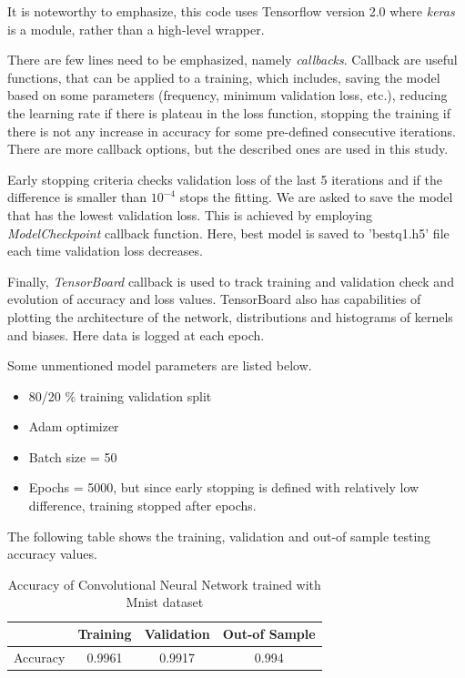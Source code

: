 \documentclass[11pt]{article}
\begin{document}
It is noteworthy to emphasize, this code uses Tensorflow version 2.0 where \emph{keras} is a module, rather than a high-level wrapper. \medskip

There are few lines need to be emphasized, namely \emph{callbacks}. Callback are useful functions, that can be applied to a training, which includes, saving the model based on some parameters (frequency, minimum validation loss, etc.), reducing the learning rate if there is plateau in the loss function, stopping the training if there is not any increase in accuracy for some pre-defined consecutive iterations. There are more callback options, but the described ones are used in this study. \medskip

Early stopping criteria checks validation loss of the last 5 iterations and if the difference is smaller than $10^{-4}$ stops the fitting. We are asked to save the model that has the lowest validation loss. This is achieved by employing \emph{ModelCheckpoint} callback function. Here, best model is saved to 'bestq1.h5' file each time validation loss decreases. \medskip

Finally, \emph{TensorBoard} callback is used to track training and validation check and evolution of accuracy and loss values. TensorBoard also has capabilities of plotting the architecture of the network, distributions and histograms of kernels and biases. Here data is logged at each epoch. \medskip

Some unmentioned model parameters are listed below.

\begin{itemize}
    \item 80/20 $\%$ training validation split
    \item Adam optimizer
    \item Batch size = 50
    \item Epochs = 5000, but since early stopping is defined with relatively low difference, training stopped after  epochs.
\end{itemize}


The following table shows the training, validation and out-of sample testing accuracy values.\medskip

\bgroup
\def\arraystretch{1.5}%
\begin{table}[H]
\centering
\caption{Accuracy of Convolutional Neural Network trained with Mnist dataset}
\begin{tabular}{|c|c|c|c|}
\hline
            &  Training     &  Validation & Out-of Sample   \\ \hline
Accuracy    &  0.9961       & 0.9917      &  0.994          \\ \hline
\end{tabular}
\label{table:q1acc}
\end{table}
\egroup
\end{document}
